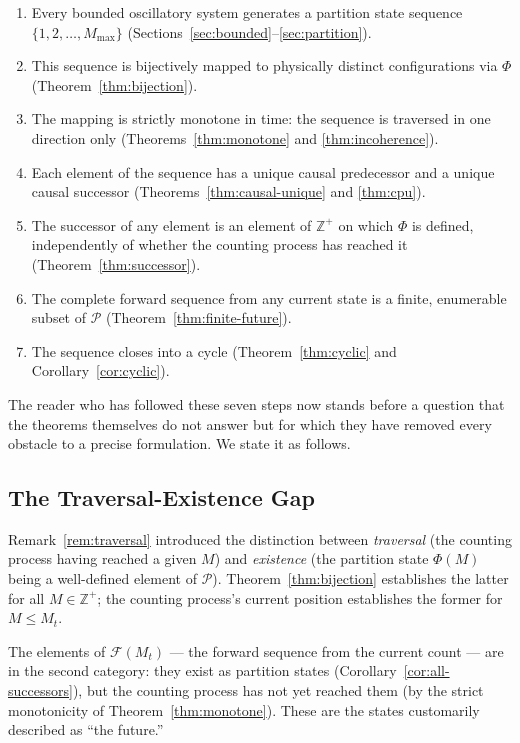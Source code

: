 \documentclass[twocolumn,10pt,a4paper]{article}
\theoremstyle{thmstyle}
\theoremstyle{definition}
\theoremstyle{remark}
\newcommand{\Zp}{\mathbb{Z}^{+}}
\newcommand{\Parts}{\mathcal{P}}
\newcommand{\Mmax}{M_{\max}}
\newcommand{\PhiMap}{\varPhi}
\begin{document}
\begin{enumerate}[leftmargin=1.5em,itemsep=0.2em]
\item Every bounded oscillatory system generates a partition state sequence $\{1, 2, \ldots, \Mmax\}$ (Sections~\ref{sec:bounded}--\ref{sec:partition}).
\item This sequence is bijectively mapped to physically distinct configurations via $\PhiMap$ (Theorem~\ref{thm:bijection}).
\item The mapping is strictly monotone in time: the sequence is traversed in one direction only (Theorems~\ref{thm:monotone} and \ref{thm:incoherence}).
\item Each element of the sequence has a unique causal predecessor and a unique causal successor (Theorems~\ref{thm:causal-unique} and \ref{thm:cpu}).
\item The successor of any element is an element of $\Zp$ on which $\PhiMap$ is defined, independently of whether the counting process has reached it (Theorem~\ref{thm:successor}).
\item The complete forward sequence from any current state is a finite, enumerable subset of $\Parts$ (Theorem~\ref{thm:finite-future}).
\item The sequence closes into a cycle (Theorem~\ref{thm:cyclic} and Corollary~\ref{cor:cyclic}).
\end{enumerate}

The reader who has followed these seven steps now stands before a question that the theorems themselves do not answer but for which they have removed every obstacle to a precise formulation. We state it as follows.

\subsection{The Traversal-Existence Gap}

Remark~\ref{rem:traversal} introduced the distinction between \emph{traversal} (the counting process having reached a given $M$) and \emph{existence} (the partition state $\PhiMap(M)$ being a well-defined element of $\Parts$). Theorem~\ref{thm:bijection} establishes the latter for all $M \in \Zp$; the counting process's current position establishes the former for $M \leq M_t$.

The elements of $\mathcal{F}(M_t)$ --- the forward sequence from the current count --- are in the second category: they exist as partition states (Corollary~\ref{cor:all-successors}), but the counting process has not yet reached them (by the strict monotonicity of Theorem~\ref{thm:monotone}). These are the states customarily described as ``the future.''
\end{document}

